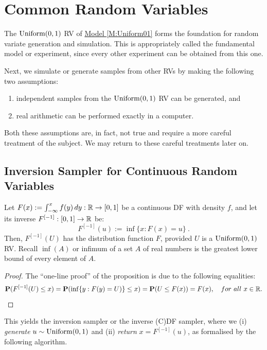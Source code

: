 \chapter{Common Random Variables}\label{S:CommonRVs}

The $\mbox{{\rm Uniform}}(0,1)$ RV of \hyperref[M:Uniform01]{Model \ref*{M:Uniform01}} forms the foundation for random variate generation and simulation.  This is appropriately called the fundamental model or experiment, since every other experiment can be obtained from this one.

Next, we simulate or generate samples from other RVs by making the following two assumptions:
\begin{enumerate}
\item independent samples from the $\mbox{{\rm Uniform}}(0,1)$ RV can be generated, and
\item real arithmetic can be performed exactly in a computer.
\end{enumerate}
Both these assumptions are, in fact, not true and require a more careful treatment of the subject.  We may return to these careful treatments later on.

\section{Inversion Sampler for Continuous Random Variables}\label{S:InvS}
\begin{prop}\label{P:InvS}
Let $F(x) := \int_{- \infty}^{x} f(y) \,d y : \mathbb{R} \rightarrow [0,1]$ be a continuous DF with density $f$, and let its inverse $F^{[-1]} : [0,1] \rightarrow \mathbb{R} $ be:
\[
F^{[-1]}(u) :=  \inf \{ x :  F(x) = u \} \ .
\]
Then, $F^{[-1]}(U)$ has the distribution function $F$, provided $U$ is a $\mbox{{\rm Uniform}}(0,1)$ RV.  Recall $\inf(A)$ or infimum of a set $A$ of real numbers is the greatest lower bound of every element of $A$.
\end{prop}
\begin{proof}
The ``one-line proof'' of the proposition is due to the following equalities:
\[
\mathbf{P}(F^{[-1]}(U) \leq x) = \mathbf{P}(\inf \{ y :  F(y) = U)\} \leq x ) = \mathbf{P}(U \leq F(x)) = F(x), \quad for~all~x \in \mathbb{R} .
\]
\end{proof}

This yields the inversion sampler or the inverse (C)DF sampler, where we (i) {\it generate} $u \sim \mbox{{\rm Uniform}}(0,1)$ and (ii) {\it return} $x = F^{[-1]}(u)$, as formalised by the following algorithm.

